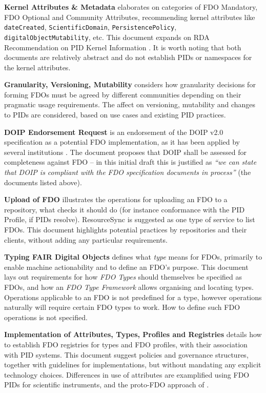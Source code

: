 \textbf{Kernel Attributes \& Metadata} \cite{fdo-KernelAttributes} elaborates on categories of FDO Mandatory, FDO Optional and Community Attributes, recommending kernel attributes like \texttt{dateCreated}, \texttt{ScientificDomain}, \texttt{PersistencePolicy}, \texttt{digitalObjectMutability}, etc. This document expands on RDA Recommendation on PID Kernel Information \cite{weigelRDARecommendationPID2018}. It is worth noting that both documents are relatively abstract and do not establish PIDs or namespaces for the kernel attributes.

\textbf{Granularity, Versioning, Mutability} \cite{fdo-Granularity} considers how granularity decisions for forming FDOs must be agreed by different communities depending on their pragmatic usage requirements. The affect on versioning, mutability and changes to PIDs are considered, based on use cases and existing PID practices.

\textbf{DOIP Endorsement Request} \cite{fdo-DOIPEndorsement} is an endorsement of the DOIP v2.0 \cite{DONA 2018} specification as a potential FDO implementation, as it has been applied by several institutions \cite{wittenburgFAIRDigitalObject2022b}. The document proposes that DOIP shall be assessed for completeness against FDO -- in this initial draft this is justified as \emph{``we can state that DOIP is compliant with the FDO specification documents in process''} (the documents listed above).

\textbf{Upload of FDO} \cite{fdo-FDO-Upload} illustrates the operations for uploading an FDO to a repository, what checks it should do (for instance conformance with the PID Profile, if PIDs resolve). ResourceSync \cite{ResourceSyncFrameworkSpecification} is suggested as one type of service to list FDOs. This document highlights potential practices by repositories and their clients, without adding any particular requirements.

\textbf{Typing FAIR Digital Objects} \cite{fdo-TypingFDOs} defines what \emph{type} means for FDOs, primarily to enable machine actionability and to define an FDO's purpose. This document lays out requirements for how \emph{FDO Types} should themselves be specified as FDOs, and how an \emph{FDO Type Framework} allows organising and locating types. Operations applicable to an FDO is not predefined for a type, however operations naturally will require certain FDO types to work. How to define such FDO operations is not specified.

\textbf{Implementation of Attributes, Types, Profiles and Registries} \cite{fdo-ImplAttributesTypesProfiles} details how to establish FDO registries for types and FDO profiles, with their association with PID systems. This document suggest policies and governance structures, together with guidelines for implementations, but without mandating any explicit technology choices. Differences in use of attributes are examplified using FDO PIDs for scientific instruments, and the proto-FDO approach of  \cite{schwardmannTwoExamplesHow2022}.

